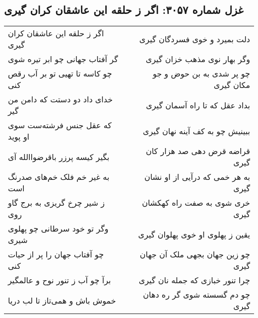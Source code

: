\begin{center}
\section*{غزل شماره ۳۰۵۷: اگر ز حلقه این عاشقان کران گیری}
\label{sec:3057}
\begin{longtable}{l p{0.5cm} r}
اگر ز حلقه این عاشقان کران گیری
&&
دلت بمیرد و خوی فسردگان گیری
\\
گر آفتاب جهانی چو ابر تیره شوی
&&
وگر بهار نوی مذهب خزان گیری
\\
چو کاسه تا تهیی تو بر آب رقص کنی
&&
چو پر شدی به بن حوض و جو مکان گیری
\\
خدای داد دو دستت که دامن من گیر
&&
بداد عقل که تا راه آسمان گیری
\\
که عقل جنس فرشته‌ست سوی او پوید
&&
ببینیش چو به کف آینه نهان گیری
\\
بگیر کیسه پرزر باقرضواالله آی
&&
قراضه قرض دهی صد هزار کان گیری
\\
به غیر خم فلک خم‌های صدرنگ است
&&
به هر خمی که درآیی از او نشان گیری
\\
ز شیر چرخ گریزی به برج گاو روی
&&
خری شوی به صفت راه کهکشان گیری
\\
وگر تو خود سرطانی چو پهلوی شیری
&&
یقین ز پهلوی او خوی پهلوان گیری
\\
چو آفتاب جهان را پر از حیات کنی
&&
چو زین جهان بجهی ملک آن جهان گیری
\\
برآ چو آب ز تنور نوح و عالمگیر
&&
چرا تنور خبازی که جمله نان گیری
\\
خموش باش و همی‌تاز تا لب دریا
&&
چو دم گسسته شوی گر ره دهان گیری
\\
\end{longtable}
\end{center}
